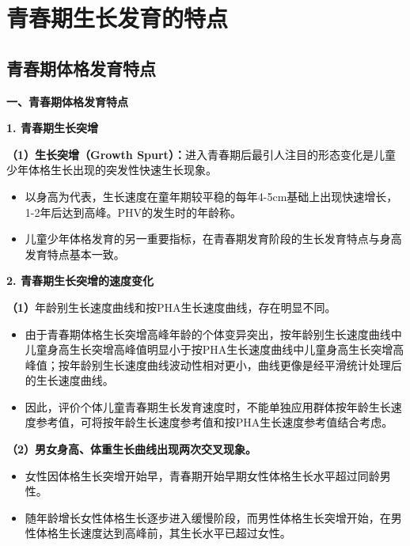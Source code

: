 \section{青春期生长发育的特点}

\subsection{青春期体格发育特点}

\begin{keybox}
\textbf{一、青春期体格发育特点}

\textbf{1. 青春期生长突增}

\textbf{（1）生长突增（Growth Spurt）：}进入青春期后最引人注目的形态变化是儿童少年体格生长出现的突发性快速生长现象。

\begin{itemize}[leftmargin=*]
    \item {}以身高为代表，生长速度在童年期较平稳的每年4-5cm基础上出现快速增长，1-2年后达到高峰。PHV的发生时的年龄称。
    \item {}儿童少年体格发育的另一重要指标，在青春期发育阶段的生长发育特点与身高发育特点基本一致。
\end{itemize}

\textbf{2. 青春期生长突增的速度变化}

\textbf{（1）}年龄别生长速度曲线和按PHA生长速度曲线，存在明显不同。
\begin{itemize}[leftmargin=*]
    \item 由于青春期体格生长突增高峰年龄的个体变异突出，按年龄别生长速度曲线中儿童身高生长突增高峰值明显小于按PHA生长速度曲线中儿童身高生长突增高峰值；按年龄别生长速度曲线波动性相对更小，曲线更像是经平滑统计处理后的生长速度曲线。
    \item 因此，评价个体儿童青春期生长发育速度时，不能单独应用群体按年龄生长速度参考值，可将按年龄生长速度参考值和按PHA生长速度参考值结合考虑。
\end{itemize}

\textbf{（2）男女身高、体重生长曲线出现两次交叉现象。}
\begin{itemize}[leftmargin=*]
    \item {}女性因体格生长突增开始早，青春期开始早期女性体格生长水平超过同龄男性。
    \item {}随年龄增长女性体格生长逐步进入缓慢阶段，而男性体格生长突增开始，在男性体格生长速度达到高峰前，其生长水平已超过女性。
\end{itemize}


\end{keybox}
